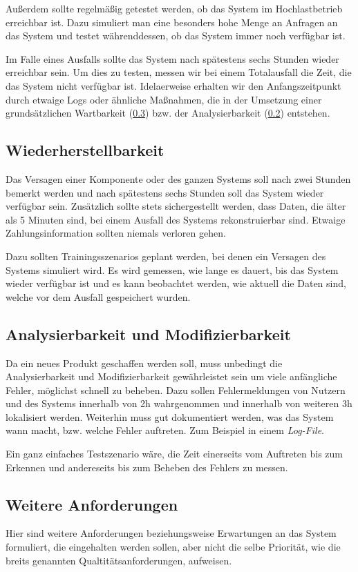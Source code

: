 Außerdem sollte regelmäßig getestet werden, ob das System im Hochlastbetrieb erreichbar ist.
Dazu simuliert man eine besonders hohe Menge an Anfragen an das System und testet währenddessen,
ob das System immer noch verfügbar ist.

Im Falle eines Ausfalls sollte das System nach spätestens sechs Stunden wieder erreichbar sein. Um dies zu testen, messen wir bei einem Totalausfall die Zeit, die das System nicht verfügbar ist. Idelaerweise erhalten wir den Anfangszeitpunkt durch etwaige Logs oder ähnliche Maßnahmen, die in der Umsetzung einer grundsätzlichen Wartbarkeit (\ref{sec:other}) bzw. der Analysierbarkeit (\ref{sec:anal}) entstehen.

\subsection{Wiederherstellbarkeit}
Das Versagen einer Komponente oder des ganzen Systems soll nach zwei Stunden bemerkt werden und nach spätestens sechs Stunden soll das System wieder verfügbar sein.
Zusätzlich sollte stets sichergestellt werden, dass Daten, die älter als 5 Minuten sind, bei einem Ausfall des Systems rekonstruierbar sind. Etwaige Zahlungsinformation sollten niemals verloren gehen.

Dazu sollten Trainingsszenarios geplant werden, bei denen ein Versagen des Systems simuliert wird.
Es wird gemessen, wie lange es dauert, bis das System wieder verfügbar ist und es kann beobachtet werden,
wie aktuell die Daten sind, welche vor dem Ausfall gespeichert wurden.


\subsection{Analysierbarkeit und Modifizierbarkeit} \label{sec:anal}
Da ein neues Produkt geschaffen werden soll, muss unbedingt die Analysierbarkeit und Modifizierbarkeit gewährleistet sein um viele anfängliche Fehler, möglichst schnell zu beheben.
Dazu sollen Fehlermeldungen von Nutzern und des Systems innerhalb von 2h wahrgenommen und innerhalb von weiteren 3h lokalisiert werden.
Weiterhin muss gut dokumentiert werden, was das System wann macht, bzw. welche Fehler auftreten. Zum Beispiel in einem \textit{Log-File}.

Ein ganz einfaches Testszenario wäre, die Zeit einerseits vom Auftreten bis zum Erkennen und andereseits bis zum Beheben des Fehlers zu messen.

\subsection{Weitere Anforderungen} \label{sec:other}
Hier sind weitere Anforderungen beziehungsweise Erwartungen an das System formuliert, die eingehalten werden sollen, aber nicht die selbe Priorität, wie die breits genannten Qualtitätsanforderungen, aufweisen.
